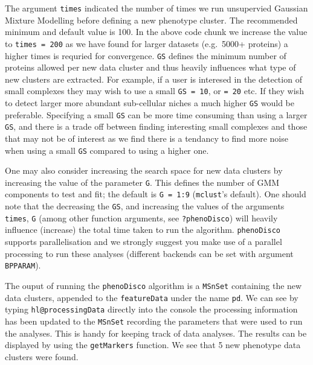 The argument \texttt{times} indicated the number of times we run
unsupervied Gaussian Mixture Modelling before defining a new phenotype
cluster. The recommended minimum and default value is 100. In the above
code chunk we increase the value to \texttt{times = 200} as we have
found for larger datasets (e.g.~5000+ proteins) a higher times is
requried for convergence. \texttt{GS} defines the minimum number of
proteins allowed per new data cluster and thus heavily influences what
type of new clusters are extracted. For example, if a user is interesed
in the detection of small complexes they may wish to use a small
\texttt{GS = 10}, or \texttt{= 20} etc. If they wish to detect larger
more abundant sub-cellular niches a much higher \texttt{GS} would be
preferable. Specifying a small \texttt{GS} can be more time consuming
than using a larger \texttt{GS}, and there is a trade off between
finding interesting small complexes and those that may not be of
interest as we find there is a tendancy to find more noise when using a
small \texttt{GS} compared to using a higher one.

One may also consider increasing the search space for new data clusters
by increasing the value of the parameter \texttt{G}. This defines the
number of GMM components to test and fit; the default is
\texttt{G = 1:9} (\texttt{mclust}'s default). One should note that the
decreasing the \texttt{GS}, and increasing the values of the arguments
\texttt{times}, \texttt{G} (among other function arguments, see
\texttt{?phenoDisco}) will heavily influence (increase) the total time
taken to run the algorithm. \texttt{phenoDisco} supports parallelisation
and we strongly suggest you make use of a parallel processing to run
these analyses (different backends can be set with argument
\texttt{BPPARAM}).

The ouput of running the \texttt{phenoDisco} algorithm is a
\texttt{MSnSet} containing the new data clusters, appended to the
\texttt{featureData} under the name \texttt{pd}. We can see by typing
\texttt{hl@processingData} directly into the console the processing
information has been updated to the \texttt{MSnSet} recording the
parameters that were used to run the analyses. This is handy for keeping
track of data analyses. The results can be displayed by using the
\texttt{getMarkers} function. We see that 5 new phenotype data clusters
were found.

\begin{Shaded}
\begin{Highlighting}[]
\end{Highlighting}
\end{Shaded}


